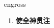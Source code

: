 
\begin{frame}
{\huge engross}
\begin{center}
\begin{enumerate}\Large
  \item \textbf{使全神贯注}
\end{enumerate}
\end{center}
\end{frame}
